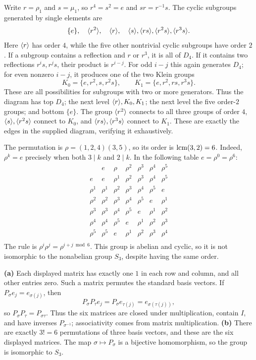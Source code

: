 Write $r=\rho_1$ and $s=\mu_1$, so $r^4=s^2=e$ and $sr=r^{-1}s$. The cyclic subgroups generated by single elements are
\[\{e\},\quad\langle r^2\rangle,\quad\langle r\rangle,\quad\langle s\rangle,\langle rs\rangle,\langle r^2s\rangle,\langle r^3s\rangle.\]
Here $\langle r\rangle$ has order $4$, while the five other nontrivial cyclic subgroups have order $2$. If a subgroup contains a reflection and $r$ or $r^3$, it is all of $D_4$. If it contains two reflections $r^is,r^js$, their product is $r^{i-j}$. For odd $i-j$ this again generates $D_4$; for even nonzero $i-j$, it produces one of the two Klein groups
\[K_0=\{e,r^2,s,r^2s\},\qquad K_1=\{e,r^2,rs,r^3s\}.\]
These are all possibilities for subgroups with two or more generators. Thus the diagram has top $D_4$; the next level $\langle r\rangle,K_0,K_1$; the next level the five order-$2$ groups; and bottom $\{e\}$. The group $\langle r^2\rangle$ connects to all three groups of order $4$, $\langle s\rangle,\langle r^2s\rangle$ connect to $K_0$, and $\langle rs\rangle,\langle r^3s\rangle$ connect to $K_1$. These are exactly the edges in the supplied diagram, verifying it exhaustively.

The permutation is $\rho=(1,2,4)(3,5)$, so its order is $\operatorname{lcm}(3,2)=6$. Indeed, $\rho^k=e$ precisely when both $3\mid k$ and $2\mid k$. In the following table $e=\rho^0=\rho^6$:
\[\begin{array}{c|cccccc}
 &e&\rho&\rho^2&\rho^3&\rho^4&\rho^5\\\hline
e & e & \rho^1 & \rho^2 & \rho^3 & \rho^4 & \rho^5\\
\rho^1 & \rho^1 & \rho^2 & \rho^3 & \rho^4 & \rho^5 & e\\
\rho^2 & \rho^2 & \rho^3 & \rho^4 & \rho^5 & e & \rho^1\\
\rho^3 & \rho^3 & \rho^4 & \rho^5 & e & \rho^1 & \rho^2\\
\rho^4 & \rho^4 & \rho^5 & e & \rho^1 & \rho^2 & \rho^3\\
\rho^5 & \rho^5 & e & \rho^1 & \rho^2 & \rho^3 & \rho^4\\\end{array}\]
The rule is $\rho^i\rho^j=\rho^{i+j\bmod6}$. This group is abelian and cyclic, so it is not isomorphic to the nonabelian group $S_3$, despite having the same order.

\textbf{(a)} Each displayed matrix has exactly one $1$ in each row and column, and all other entries zero. Such a matrix permutes the standard basis vectors. If $P_\sigma e_j=e_{\sigma(j)}$, then
\[P_\sigma P_\tau e_j=P_\sigma e_{\tau(j)}=e_{\sigma(\tau(j))},\]
so $P_\sigma P_\tau=P_{\sigma\tau}$. Thus the six matrices are closed under multiplication, contain $I$, and have inverses $P_{\sigma^{-1}}$; associativity comes from matrix multiplication.
\textbf{(b)} There are exactly $3!=6$ permutations of three basis vectors, and these are the six displayed matrices. The map $\sigma\mapsto P_\sigma$ is a bijective homomorphism, so the group is isomorphic to $S_3$.


